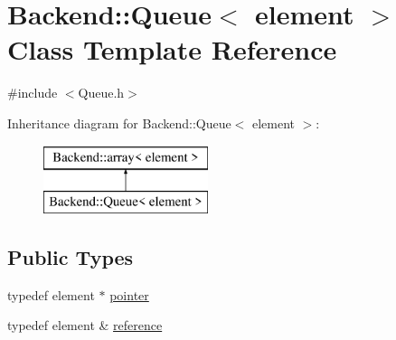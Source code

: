 \hypertarget{class_backend_1_1_queue}{\section{Backend\+:\+:Queue$<$ element $>$ Class Template Reference}
\label{class_backend_1_1_queue}
}


{\ttfamily \#include $<$Queue.\+h$>$}

Inheritance diagram for Backend\+:\+:Queue$<$ element $>$\+:\begin{figure}[H]
\begin{center}
\leavevmode
\includegraphics[height=2.000000cm]{class_backend_1_1_queue}
\end{center}
\end{figure}
\subsection*{Public Types}
\begin{DoxyCompactItemize}
\item 
typedef element $\ast$ \hyperlink{class_backend_1_1array_a6d8785dc8b979153ef122f4e3bad1408}{pointer}
\item 
typedef element \& \hyperlink{class_backend_1_1array_aa98075b8d7a4e63ea919ee9d1d4df4a9}{reference}
\end{DoxyCompactItemize}
